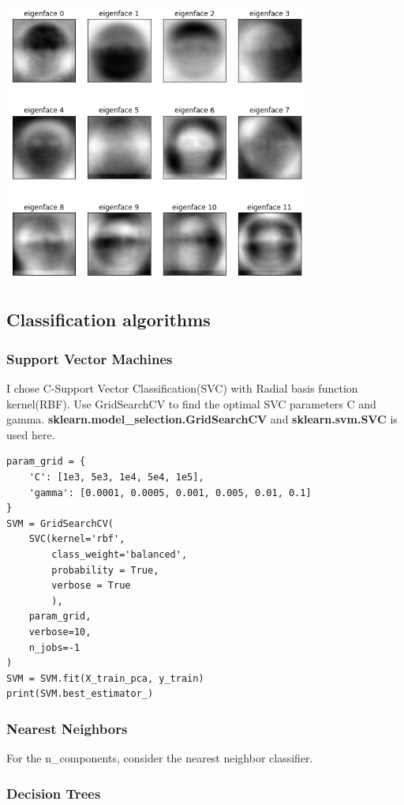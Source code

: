 \documentclass{article}
\begin{document}
\begin{center}
  \includegraphics[width=10cm]{eigenfaces.png}
\end{center}

\subsection{Classification algorithms}


\subsubsection{Support Vector Machines}
I chose C-Support Vector Classification(SVC) with Radial basis function kernel(RBF). Use GridSearchCV to find the optimal SVC parameters C and gamma.
\textbf{sklearn.model\_selection.GridSearchCV} and \textbf{sklearn.svm.SVC} is used here.
\begin{lstlisting}
param_grid = {
    'C': [1e3, 5e3, 1e4, 5e4, 1e5],
    'gamma': [0.0001, 0.0005, 0.001, 0.005, 0.01, 0.1]
}
SVM = GridSearchCV(
    SVC(kernel='rbf',
        class_weight='balanced',
        probability = True,
        verbose = True
        ),
    param_grid,
    verbose=10,
    n_jobs=-1
)
SVM = SVM.fit(X_train_pca, y_train)
print(SVM.best_estimator_)
\end{lstlisting}

\subsubsection{Nearest Neighbors}
For the n\_components, consider the nearest neighbor classifier.

\subsubsection{Decision Trees}
\end{document}
